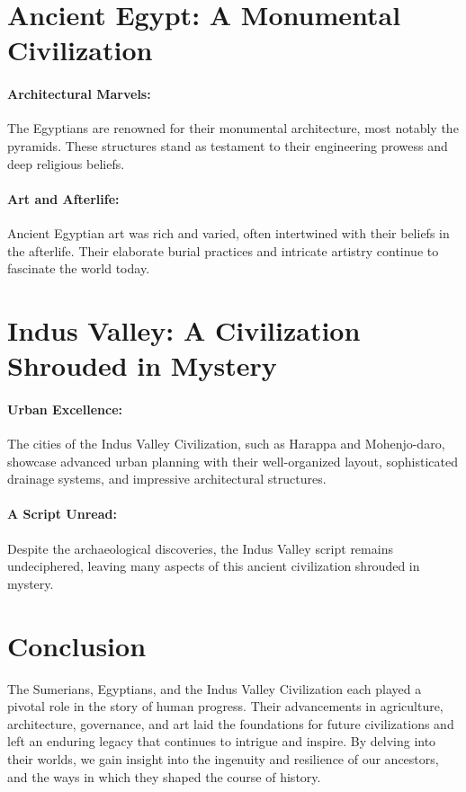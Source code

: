 \documentclass[a4paper,12pt]{book}
\begin{document}
\section*{Ancient Egypt: A Monumental Civilization}

\paragraph{Architectural Marvels:}
The Egyptians are renowned for their monumental architecture, most notably the pyramids. These structures stand as testament to their engineering prowess and deep religious beliefs.

\paragraph{Art and Afterlife:}
Ancient Egyptian art was rich and varied, often intertwined with their beliefs in the afterlife. Their elaborate burial practices and intricate artistry continue to fascinate the world today.

\section*{Indus Valley: A Civilization Shrouded in Mystery}

\paragraph{Urban Excellence:}
The cities of the Indus Valley Civilization, such as Harappa and Mohenjo-daro, showcase advanced urban planning with their well-organized layout, sophisticated drainage systems, and impressive architectural structures.

\paragraph{A Script Unread:}
Despite the archaeological discoveries, the Indus Valley script remains undeciphered, leaving many aspects of this ancient civilization shrouded in mystery.

\section*{Conclusion}

The Sumerians, Egyptians, and the Indus Valley Civilization each played a pivotal role in the story of human progress. Their advancements in agriculture, architecture, governance, and art laid the foundations for future civilizations and left an enduring legacy that continues to intrigue and inspire. By delving into their worlds, we gain insight into the ingenuity and resilience of our ancestors, and the ways in which they shaped the course of history.
\end{document}
